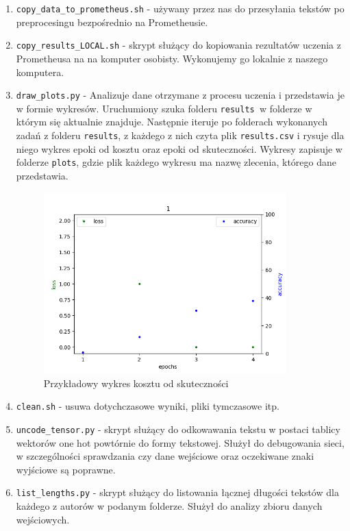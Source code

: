 \begin{enumerate}
	\item {\texttt{copy\_data\_to\_prometheus.sh} } - używany przez nas do przesyłania tekstów po preprocesingu
	bezpośrednio na Prometheusie. 
	
	\item {\texttt{copy\_results\_LOCAL.sh} } - skrypt służący do kopiowania rezultatów uczenia z Prometheusa na 
	na komputer osobisty. Wykonujemy go lokalnie z naszego komputera. 

	\item {\texttt{draw\_plots.py} } - Analizuje dane otrzymane z procesu uczenia i przedstawia je w formie wykresów.
	Uruchumiony szuka folderu \texttt{results }w folderze w którym się aktualnie znajduje. Następnie iteruje po folderach
	wykonanych zadań z folderu \texttt{results}, z każdego z nich czyta plik \texttt{results.csv} i rysuje dla niego wykres epoki od kosztu
 	oraz epoki od skuteczności. Wykresy zapisuje w folderze \texttt{plots}, gdzie plik każdego wykresu ma nazwę 
 	zlecenia, którego dane przedstawia.
 	
 	\begin{figure}[H]
	\centering
	\includegraphics[height=7cm]{./images/plot.png}
	\caption{Przykładowy wykres kosztu od skuteczności}
	\label{fig:test5}
	\end{figure}
 	
	
	\item {\texttt{clean.sh} } - usuwa dotychczasowe wyniki, pliki tymczasowe itp.
	
	\item {\texttt{uncode\_tensor.py} } - skrypt służący do odkowawania tekstu w postaci tablicy wektorów one hot powtórnie do 
 	formy tekstowej. Służył do debugowania sieci, w szczególności sprawdzania czy dane wejściowe oraz 
 	oczekiwane znaki wyjściowe są poprawne.
 	
 	\item {\texttt{list\_lengths.py} } - skrypt służący do listowania łącznej długości tekstów dla każdego z autorów
 	w podanym folderze. Służył do analizy zbioru danych wejściowych.
	
	
	
\end{enumerate}



